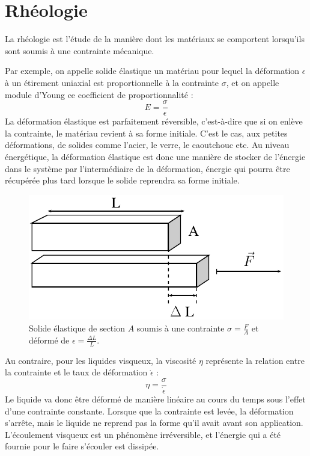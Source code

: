 \section{Rhéologie}

La rhéologie est l'étude de la manière dont les matériaux se comportent lorsqu'ils sont soumis à une contrainte mécanique.

Par exemple, on appelle solide élastique un matériau pour lequel la déformation $\epsilon$ à un étirement uniaxial est proportionnelle à la contrainte $ \sigma$, et on appelle module d'Young ce coefficient de proportionnalité : 
$$ E = \frac{\sigma}{\epsilon}$$
La déformation élastique est parfaitement réversible, c'est-à-dire que si on enlève la contrainte, le matériau revient à sa forme initiale. C'est le cas, aux petites déformations, de solides comme l'acier, le verre, le caoutchouc etc. Au niveau énergétique, la déformation élastique est donc une manière de stocker de l'énergie dans le système par l'intermédiaire de la déformation, énergie qui pourra être récupérée plus tard lorsque le solide reprendra sa forme initiale. 

\begin{figure}
\includegraphics[scale=0.5]{Figures/Young_modulus.pdf} 
\caption{Solide élastique de section $A$ soumis à une contrainte $\sigma=\frac{F}{A}$ et déformé de $\epsilon=\frac{\Delta L}{L}$.  }
\end{figure}

Au contraire, pour les liquides visqueux, la viscosité $\eta$ représente la relation entre la contrainte et le taux de déformation $\dot{\epsilon}$ : 
$$ \eta=\frac{\sigma}{\dot{\epsilon}}$$
Le liquide va donc être déformé de manière linéaire au cours du temps sous l'effet d'une contrainte constante. Lorsque que la contrainte est levée, la déformation s'arrête, mais le liquide ne reprend pas la forme qu'il avait avant son application. 
L'écoulement visqueux est un phénomène irréversible, et l'énergie qui a été fournie pour le faire s'écouler est dissipée. 

